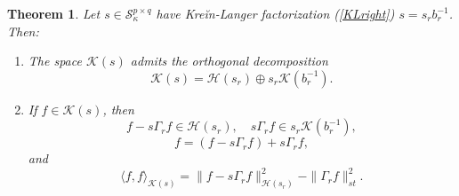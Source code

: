 \documentclass[12pt,twoside,a4paper]{amsart}
\newtheorem{thm}{Theorem}[section]
\theoremstyle{definition}
\numberwithin{equation}{section}
\begin{document}
\begin{thm}\label{thm:1.10}
Let $s\in {\mathcal S}^{p\times q}_\kappa$ have Kre\u{i}n-Langer factorization
(\ref{KLright}) $s=s_rb_r^{-1}$. Then:
\begin{enumerate}
    \item [\rm(1)] The space ${{\mathcal K}}(s)$ admits the orthogonal
    decomposition
    \begin{equation}\label{eq:1.2}
    {{\mathcal K}}(s)={{\mathcal H}}(s_r)\oplus s_r  {{\mathcal K}}(b^{-1}_r).
    \end{equation}
    \item [\rm(2)] If $f\in {{\mathcal K}}(s)$, then
\begin{equation}\label{eq:1.3a}
    f-s\Gamma_rf\in{{\mathcal H}}(s_r),\quad s\Gamma_r f\in s_r{{\mathcal K}}(b^{-1}_r),
\end{equation}
    \begin{equation}\label{eq:1.3}
   f=(f-s\Gamma_r f)+s\Gamma_rf,
\end{equation}
and
\begin{equation}\label{eq:1.4}
   \langle
   f,f\rangle_{{{\mathcal K}}(s)}=\|f-s\Gamma_rf\|^2_{{{\mathcal H}}(s_r)}-\|\Gamma_rf\|^2_{st}.
   \end{equation}
\end{enumerate}
\end{thm}
\end{document}
